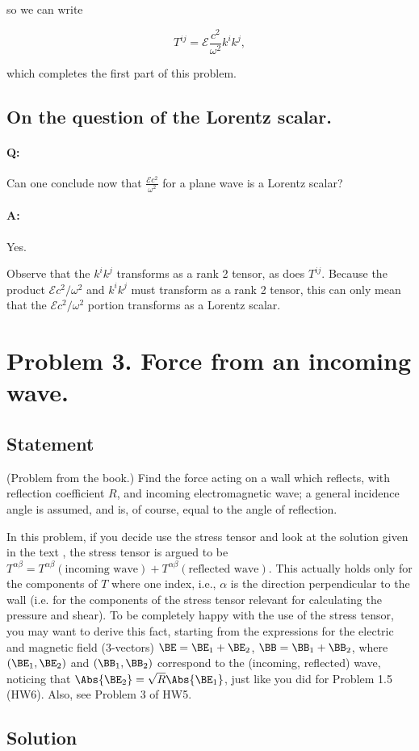 so we can write

\begin{equation}\label{eqn:relElectroDynProblemSet6:190}
T^{i j} 
= \mathcal{E} \frac{c^2}{\omega^2} k^i k^j,
\end{equation}

which completes the first part of this problem.

\subsection{On the question of the Lorentz scalar.}

\paragraph{Q:} Can one conclude now that $\frac{\mathcal{E} c^2}{\omega^2}$ for a plane wave is a Lorentz scalar?
\paragraph{A:} Yes.

Observe that the $k^i k^j$ transforms as a rank 2 tensor, as does $T^{i j}$.  Because the product $\mathcal{E} c^2/\omega^2$ and $k^i k^j$ must transform as a rank 2 tensor, this can only mean that the $\mathcal{E} c^2/\omega^2$ portion transforms as a Lorentz scalar.

\section{Problem 3.  Force from an incoming wave.}
\subsection{Statement}

(Problem from the book.)  Find the force acting on a wall which reflects, with reflection coefficient $R$, and incoming electromagnetic wave; a general incidence angle is assumed, and is, of course, equal to the angle of reflection.

In this problem, if you decide use the stress tensor and look at the solution given in the text \cite{landau1980classical}, the stress tensor is argued to be  $T^{\alpha \beta} = T^{\alpha \beta}(\text{incoming wave}) + T^{\alpha \beta}(\text{reflected wave})$.  This actually holds only for the components of $T$ where one index, i.e., $\alpha$ is the direction perpendicular to the wall (i.e. for the components of the stress tensor relevant for calculating the pressure and shear). To be completely happy with the use of the stress tensor, you may want to derive this fact, starting from the expressions for the electric and magnetic field (3-vectors) $\BE = \BE_1 + \BE_2$, $\BB = \BB_1 + \BB_2$, where $(\BE_1, \BE_2)$ and $(\BB_1, \BB_2)$ correspond to the (incoming, reflected) wave, noticing that $\Abs{\BE_2} = \sqrt{R}\Abs{\BE_1}$, just like you did for Problem 1.5 (HW6).  Also, see Problem 3 of HW5.

\subsection{Solution}

\EndArticle
